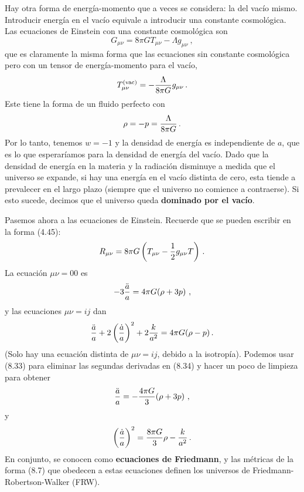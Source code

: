 \documentclass[11pt,b5paper,openany,twoside]{book}
\newcommand{\mn}{{\mu\nu}}
\begin{document}
Hay otra forma de energía-momento que a veces se considera: la del vacío mismo.
Introducir energía en el vacío equivale a introducir una constante cosmológica.
Las ecuaciones de Einstein con una constante cosmológica son
\begin{equation}
G_\mn = 8\pi GT_\mn -\Lambda g_\mn \ ,\label{8.29}
\end{equation}
que es claramente la misma forma que las ecuaciones sin constante cosmológica pero con un tensor de energía-momento para el vacío,
\begin{equation}
T^{\rm (vac)}_\mn = -{{\Lambda}\over{8\pi G}}g_\mn\,.\label{8.30}
\end{equation}
Este tiene la forma de un fluido perfecto con
\begin{equation}
\rho = -p = {{\Lambda}\over{8\pi G}}\,.\label{8.31}
\end{equation}
Por lo tanto, tenemos $w=-1$ y la densidad de energía es independiente de $a$, que es lo que esperaríamos para la densidad de energía del vacío.
Dado que la densidad de energía en la materia y la radiación disminuye a medida que el universo se expande, si hay una energía en el vacío distinta de cero, esta tiende a prevalecer en el largo plazo (siempre que el universo no comience a contraerse).
Si esto sucede, decimos que el universo queda {\bf dominado por el vacío}.

Pasemos ahora a las ecuaciones de Einstein.
Recuerde que se pueden escribir en la forma (4.45):
\begin{equation}
R_\mn = 8\pi G\left(T_\mn - {1\over 2}g_\mn T\right)\,.
\label{8.32}
\end{equation}
La ecuación $\mn = 00$ es
\begin{equation}
-3{{\ddot a}\over a}=4\pi G(\rho+3p)\ ,\label{8.33}
\end{equation}
y las ecuaciones $\mn = ij$ dan
\begin{equation}
{{\ddot a}\over a} + 2\left({{\dot a}\over a}\right)^2
+2{k\over{a^2}}= 4\pi G(\rho-p)\,.\label{8.34}
\end{equation}
(Solo hay una ecuación distinta de $\mn = ij$, debido a la isotropía).
Podemos usar (8.33) para eliminar las segundas derivadas en (8.34) y hacer un poco de limpieza para obtener
\begin{equation}
{{\ddot a}\over a}=-{{4\pi G}\over 3}(\rho+3p)\ ,\label{8.35}
\end{equation}
y
\begin{equation}
\left({{\dot a}\over a}\right)^2={{8\pi G}\over 3}\rho
-{{k}\over a^2}\,.\label{8.36}
\end{equation}
En conjunto, se conocen como {\bf ecuaciones de Friedmann}, y las métricas de la forma (8.7) que obedecen a estas ecuaciones definen los universos de Friedmann-Robertson-Walker (FRW).
\end{document}
